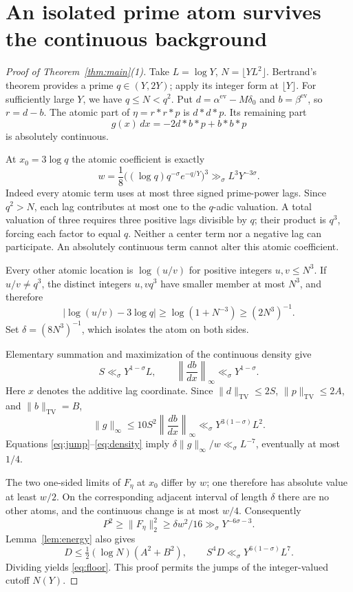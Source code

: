 \documentclass[11pt,a4paper]{article}
\theoremstyle{definition}
\theoremstyle{remark}
\newcommand{\TV}{\mathrm{TV}}
\newcommand{\ev}{\mathrm{ev}}
\newcommand{\dd}{\,d}
\begin{document}
\section{An isolated prime atom survives the continuous background}

\begin{proof}[Proof of Theorem~\ref{thm:main}(1)]
Take \(L=\log Y\), \(N=\lfloor YL^2\rfloor\).
Bertrand's theorem \cite{Erdos} provides a prime \(q\in(Y,2Y)\);
apply its integer form at \(\lfloor Y\rfloor\).
For sufficiently large \(Y\), we have \(q\le N<q^2\).
Put \(d=\alpha^\ev-M\delta_0\) and \(b=\beta^\ev\), so \(r=d-b\).
The atomic part of \(\eta=r*r*p\) is \(d*d*p\). Its remaining part
\[
 g(x)\dd x=-2d*b*p+b*b*p
\]
is absolutely continuous.

At \(x_0=3\log q\) the atomic coefficient is exactly
\begin{equation}
 w=\frac18\bigl((\log q)q^{-\sigma}e^{-q/Y}\bigr)^3
 \gg_\sigma L^3Y^{-3\sigma}.
 \label{eq:jump}
\end{equation}
Indeed every atomic term uses at most three signed prime-power
lags. Since \(q^2>N\), each lag contributes at most one to the
\(q\)-adic valuation. A total valuation of three requires three
positive lags divisible by \(q\); their product is \(q^3\), forcing
each factor to equal \(q\). Neither a center term nor a negative
lag can participate. An absolutely continuous term cannot alter
this atomic coefficient.

Every other atomic location is \(\log(u/v)\) for positive integers
\(u,v\le N^3\). If \(u/v\ne q^3\), the distinct integers \(u,vq^3\)
have smaller member at most \(N^3\), and therefore
\begin{equation}
 |\log(u/v)-3\log q|
 \ge\log(1+N^{-3})\ge(2N^3)^{-1}.
 \label{eq:spacing}
\end{equation}
Set \(\delta=(8N^3)^{-1}\), which isolates the atom on both sides.

Elementary summation and maximization of the continuous density give
\[
 S\ll_\sigma Y^{1-\sigma}L,\qquad
 \left\|\frac{db}{dx}\right\|_\infty\ll_\sigma Y^{1-\sigma}.
\]
Here \(x\) denotes the additive lag coordinate. Since
\(\|d\|_\TV\le2S\), \(\|p\|_\TV\le2A\), and \(\|b\|_\TV=B\),
\begin{equation}
 \|g\|_\infty
 \le10S^2\left\|\frac{db}{dx}\right\|_\infty
 \ll_\sigma Y^{3(1-\sigma)}L^2.
 \label{eq:density}
\end{equation}
Equations \eqref{eq:jump}--\eqref{eq:density} imply
\(\delta\|g\|_\infty/w\ll_\sigma L^{-7}\), eventually at most \(1/4\).

The two one-sided limits of \(F_\eta\) at \(x_0\) differ by \(w\);
one therefore has absolute value at least \(w/2\).
On the corresponding adjacent interval of length \(\delta\) there
are no other atoms, and the continuous change is at most \(w/4\).
Consequently
\[
 P^2\ge\|F_\eta\|_2^2\ge\delta w^2/16
 \gg_\sigma Y^{-6\sigma-3}.
\]
Lemma~\ref{lem:energy} also gives
\[
 D\le\tfrac12(\log N)(A^2+B^2),\qquad
 S^4D\ll_\sigma Y^{6(1-\sigma)}L^7.
\]
Dividing yields \eqref{eq:floor}. This proof permits the jumps of
the integer-valued cutoff \(N(Y)\).
\end{proof}
\end{document}
